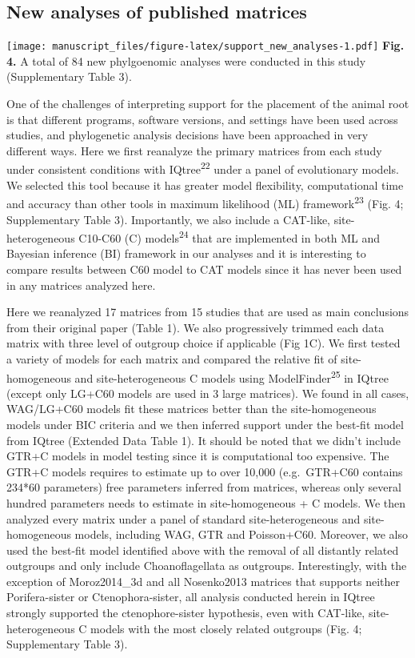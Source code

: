 \documentclass[]{article}
\begin{document}
\hypertarget{new-analyses-of-published-matrices}{%
\subsection{New analyses of published
matrices}\label{new-analyses-of-published-matrices}}

\texttt{[image: manuscript\_files/figure-latex/support\_new\_analyses-1.pdf]}
\textbf{Fig. 4.} A total of 84 new phylgoenomic analyses were conducted
in this study (Supplementary Table 3).

One of the challenges of interpreting support for the placement of the
animal root is that different programs, software versions, and settings
have been used across studies, and phylogenetic analysis decisions have
been approached in very different ways. Here we first reanalyze the
primary matrices from each study under consistent conditions with
IQtree\textsuperscript{22} under a panel of evolutionary models. We
selected this tool because it has greater model flexibility,
computational time and accuracy than other tools in maximum likelihood
(ML) framework\textsuperscript{23} (Fig. 4; Supplementary Table 3).
Importantly, we also include a CAT-like, site-heterogeneous C10-C60 (C)
models\textsuperscript{24} that are implemented in both ML and Bayesian
inference (BI) framework in our analyses and it is interesting to
compare results between C60 model to CAT models since it has never been
used in any matrices analyzed here.

Here we reanalyzed 17 matrices from 15 studies that are used as main
conclusions from their original paper (Table 1). We also progressively
trimmed each data matrix with three level of outgroup choice if
applicable (Fig 1C). We first tested a variety of models for each matrix
and compared the relative fit of site-homogeneous and site-heterogeneous
C models using ModelFinder\textsuperscript{25} in IQtree (except only
LG+C60 models are used in 3 large matrices). We found in all cases,
WAG/LG+C60 models fit these matrices better than the site-homogeneous
models under BIC criteria and we then inferred support under the
best-fit model from IQtree (Extended Data Table 1). It should be noted
that we didn't include GTR+C models in model testing since it is
computational too expensive. The GTR+C models requires to estimate up to
over 10,000 (e.g.~GTR+C60 contains 234*60 parameters) free parameters
inferred from matrices, whereas only several hundred parameters needs to
estimate in site-homogeneous + C models. We then analyzed every matrix
under a panel of standard site-heterogeneous and site-homogeneous
models, including WAG, GTR and Poisson+C60. Moreover, we also used the
best-fit model identified above with the removal of all distantly
related outgroups and only include Choanoflagellata as outgroups.
Interestingly, with the exception of Moroz2014\_3d and all Nosenko2013
matrices that supports neither Porifera-sister or Ctenophora-sister, all
analysis conducted herein in IQtree strongly supported the
ctenophore-sister hypothesis, even with CAT-like, site-heterogeneous C
models with the most closely related outgroups (Fig. 4; Supplementary
Table 3).
\end{document}
